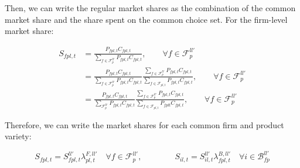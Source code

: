 \noindent Then, we can write the regular market shares as the combination of the common market share and the share spent on the common choice set. For the firm-level market share:
\begin{linenomath*}
    \begin{equation*}
        \begin{aligned}
        S_{fpl,t}   &=  \frac{P_{fpl,t}C_{fpl,t}}
                             {\sum_{f \in \mathcal{F}^{ll'}_{p}} P_{fpl,t}C_{fpl,t}}, 
                        \qquad \forall f \in \mathcal{F}^{ll'}_{p} \\
                    &=  \frac{P_{fpl,t}C_{fpl,t}}
                             {\sum_{f \in \mathcal{F}^{ll'}_{p}} P_{fpl,t}C_{fpl,t}}
                        \frac{\sum_{f \in \mathcal{F}^{ll'}_{p}} P_{fpl,t}C_{fpl,t}}
                             {\sum_{f \in \mathcal{F}_{pl,t}} P_{fpl,t}C_{fpl,t}}, 
                        \qquad \forall f \in \mathcal{F}^{ll'}_p\\
                    &=  \frac{P_{fpl,t}C_{fpl,t}}
                             {\sum_{\mathcal{F}^{ll'}_{p}} P_{fpl,t}C_{fpl,t}}
                        \frac{\sum_{f \in \mathcal{F}^{ll'}_{p}}P_{fpl,t}C_{fpl,t}}
                             {\sum_{f \in \mathcal{F}_{pl,t}}P_{fplt}C_{fpl,t}}, 
                        \qquad \forall f \in \mathcal{F}^{ll'}_p
        \end{aligned}
    \end{equation*}
\end{linenomath*}

\noindent Therefore, we can write the market shares for each common firm and product variety:  

\begin{linenomath*}
    \begin{equation*}
        S_{fpl,t} = S^{ll'}_{fpl,t} \lambda^{F,ll'}_{pl,t}
            \quad \forall f \in \mathcal{F}^{ll'}_{p}, \qquad \qquad 
        S_{il,t}  = S^{ll'}_{il,t} \lambda^{B,ll'}_{fpl,t}
            \quad \forall i \in \mathcal{B}^{ll'}_{fp}
    \end{equation*}
\end{linenomath*}

